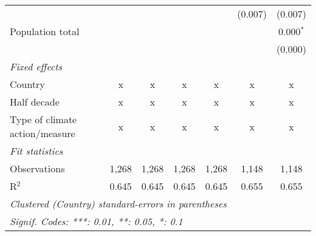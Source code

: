 \begin{tabular}{lcccccc}
                                                    &         &         &         &         & (0.007) & (0.007)\\   
   Population total                                 &         &         &         &         &         & 0.000$^{*}$\\   
                                                    &         &         &         &         &         & (0.000)\\   
   \emph{Fixed effects}\\
   Country                                          & x       & x       & x       & x       & x       & x\\  
   Half decade                                      & x       & x       & x       & x       & x       & x\\  
   Type of climate action/measure                   & x       & x       & x       & x       & x       & x\\  
   \midrule \emph{Fit statistics}\\
   Observations                                     & 1,268   & 1,268   & 1,268   & 1,268   & 1,148   & 1,148\\  
   R$^2$                                            & 0.645   & 0.645   & 0.645   & 0.645   & 0.655   & 0.655\\  
   \midrule
   \multicolumn{7}{l}{\emph{Clustered (Country) standard-errors in parentheses}}\\
   \multicolumn{7}{l}{\emph{Signif. Codes: ***: 0.01, **: 0.05, *: 0.1}}\\
\end{tabular}
\par\endgroup


